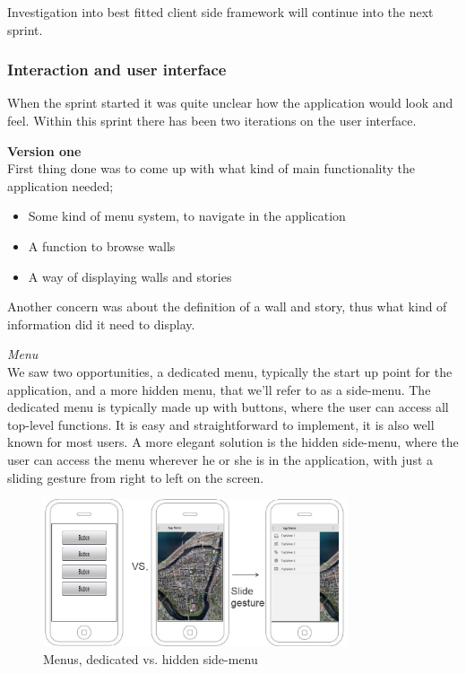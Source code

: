 \documentclass[11pt]{book}
\begin{document}
Investigation into best fitted client side framework will continue into the next sprint.

\subsubsection{Interaction and user interface}
When the sprint started it was quite unclear how the application would look and feel. Within this sprint there has been two iterations on the user interface.

\textbf{Version one}\\
First thing done was to come up with what kind of main functionality the application needed;

\begin{itemize}
	\item Some kind of menu system, to navigate in the application
	\item A function to browse walls
	\item A way of displaying walls and stories
\end{itemize}

Another concern was about the definition of a wall and story, thus what kind of information did it need to display.

\textit{Menu}\\
We saw two opportunities, a dedicated menu, typically the start up point for the application, and a more hidden menu, that we'll refer to as a side-menu. The dedicated menu is typically made up with buttons, where the user can access all top-level functions. It is easy and straightforward to implement, it is also well known for most users. A more elegant solution is the hidden side-menu, where the user can access the menu wherever he or she is in the application, with just a sliding gesture from right to left on the screen.

\begin{figure}[H]
    \centering
    \includegraphics[width=0.8\textwidth]{Figures/Phases/Sprint1/versiononeSliding.png}
    \caption{Menus, dedicated vs. hidden side-menu}
    \label{fig:phases_sprint1_uiVersionOneMenu}
\end{figure}
\end{document}

